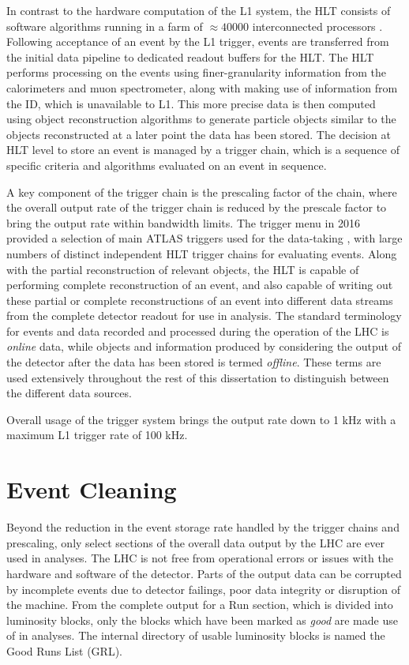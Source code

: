 	In contrast to the hardware computation of the L1 system, the HLT consists of software algorithms running in a farm  of $\approx40000$ interconnected processors \cite{trigrun2017}. Following acceptance of an event by the L1 trigger, events are transferred from the initial data pipeline to dedicated readout buffers for the HLT. The HLT performs processing on the events using finer-granularity information from the calorimeters and muon spectrometer, along with making use of information from the ID, which is unavailable to L1. This more precise data is then computed using object reconstruction algorithms to generate particle objects similar to the objects reconstructed at a later point the data has been stored. The decision at HLT level to store an event is managed by a trigger chain, which is a sequence of specific criteria and algorithms evaluated on an event in sequence.

	A key component of the trigger chain is the prescaling factor of the chain, where the overall output rate of the trigger chain is reduced by the prescale factor to bring the output rate within bandwidth limits. The trigger menu in 2016 provided a selection of main ATLAS triggers used for the data-taking \cite{triggermenu}, with large numbers of distinct independent HLT trigger chains for evaluating events. Along with the partial reconstruction of relevant objects, the HLT is capable of performing complete reconstruction of an event, and also capable of writing out these partial or complete reconstructions of an event into different data streams from the complete detector readout for use in analysis. The standard terminology for events and data recorded and processed during the operation of the LHC is \textit{online} data, while objects and information produced by considering the output of the detector after the data has been stored is termed \textit{offline}. These terms are used extensively throughout the rest of this dissertation to distinguish between the different data sources.

	Overall usage of the trigger system brings the output rate down to 1 kHz with a maximum L1 trigger rate of 100 kHz.

\section{Event Cleaning}

	Beyond the reduction in the event storage rate handled by the trigger chains and prescaling, only select sections of the overall data output by the LHC are ever used in analyses. The LHC is not free from operational errors or issues with the hardware and software of the detector. Parts of the output data can be corrupted by incomplete events due to detector failings, poor data integrity or disruption of the machine. From the complete output for a Run section, which is divided into luminosity blocks, only the blocks which have been marked as \textit{good} are made use of in analyses. The internal directory of usable luminosity blocks is named the Good Runs List (GRL).

